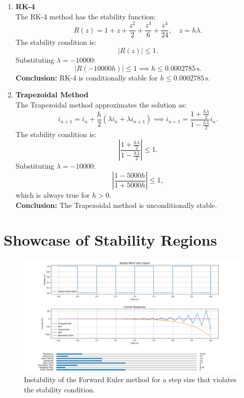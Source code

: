 \begin{enumerate}
    \item \textbf{RK-4}\\
    The RK-4 method has the stability function:
    \begin{equation}
        R(z) = 1 + z + \frac{z^2}{2} + \frac{z^3}{6} + \frac{z^4}{24}, \quad z = h \lambda.
    \end{equation}
    The stability condition is:
    \begin{equation}
        |R(z)| \leq 1.
    \end{equation}
    Substituting \( \lambda = -10000 \):
    \begin{equation}
        |R(-10000 h)| \leq 1 \implies h \leq 0.0002785 \, \text{s}.
    \end{equation}
    \textbf{Conclusion:} RK-4 is conditionally stable for \( h \leq 0.0002785 \, \text{s} \).


    \item \textbf{Trapezoidal Method}\\
    The Trapezoidal method approximates the solution as:
    \begin{equation}
        i_{n+1} = i_n + \frac{h}{2} (\lambda i_n + \lambda i_{n+1}) \implies i_{n+1} = \frac{1 + \frac{h \lambda}{2}}{1 - \frac{h \lambda}{2}} i_n.
    \end{equation}
    The stability condition is:
    \begin{equation}
        \left| \frac{1 + \frac{h \lambda}{2}}{1 - \frac{h \lambda}{2}} \right| \leq 1.
    \end{equation}
    Substituting \( \lambda = -10000 \):
    \begin{equation}
        \left| \frac{1 - 5000 h}{1 + 5000 h} \right| \leq 1,
    \end{equation}
    which is always true for \( h > 0 \).\\
    \textbf{Conclusion:} The Trapezoidal method is unconditionally stable.

\end{enumerate}

\section{Showcase of Stability Regions}
\begin{figure}[H]
  \centering
  \includegraphics[width=\textwidth]{figs/instability_fwd_euler.png}
  \caption{Instability of the Forward Euler method for a step size that violates the stability condition.}
  \label{fig:instability_forward_euler}
\end{figure}

